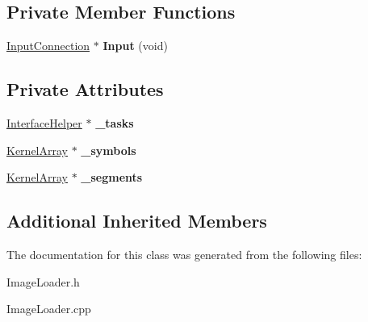 \subsection*{Private Member Functions}
\begin{DoxyCompactItemize}
\item 
\mbox{\label{class_image_loader_a640b3940e97c44543443044079a9eb13}} 
\hyperlink{class_generic_provider_1_1_input_connection}{Input\+Connection} $\ast$ {\bfseries Input} (void)
\end{DoxyCompactItemize}
\subsection*{Private Attributes}
\begin{DoxyCompactItemize}
\item 
\mbox{\label{class_image_loader_a9d8d31cfd04da62114dc315e19682ffc}} 
\hyperlink{class_interface_helper}{Interface\+Helper} $\ast$ {\bfseries \+\_\+tasks}
\item 
\mbox{\label{class_image_loader_aaf0bbc6e3e14de1414caa7c2255c52ac}} 
\hyperlink{class_kernel_array}{Kernel\+Array} $\ast$ {\bfseries \+\_\+symbols}
\item 
\mbox{\label{class_image_loader_a9f049d25ae5841fe9e7e10bb9d0cd374}} 
\hyperlink{class_kernel_array}{Kernel\+Array} $\ast$ {\bfseries \+\_\+segments}
\end{DoxyCompactItemize}
\subsection*{Additional Inherited Members}


The documentation for this class was generated from the following files\+:\begin{DoxyCompactItemize}
\item 
Image\+Loader.\+h\item 
Image\+Loader.\+cpp\end{DoxyCompactItemize}
